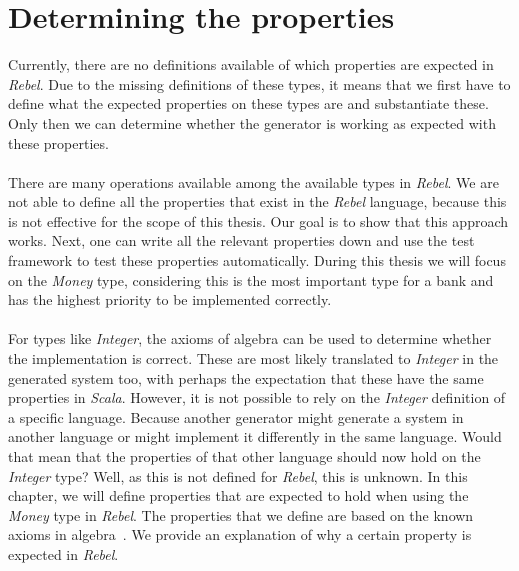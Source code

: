 \section{Determining the properties}
Currently, there are no definitions available of which properties are expected
in \textit{Rebel}. Due to the missing definitions of these types, it means that
we first have to define what the expected properties
on these types are and substantiate these. Only then we can determine whether
the generator is working as expected with these properties.\\
\\
There are many operations available among the available types in \textit{Rebel}.
We are not able to define all the properties that exist in the \textit{Rebel}
language, because this is not effective for the scope of this thesis. Our goal
is to show that this approach works. Next, one can write all the relevant properties
down and use the test framework to test these properties automatically. During
this thesis we will focus on the \textit{Money} type, considering this is the
most important type for a bank and has the highest priority to be implemented
correctly.\\
\\
For types like \textit{Integer}, the axioms of algebra can be used to determine whether
the implementation is correct. These are most likely translated to \textit{Integer} in
the generated system too, with perhaps the expectation that these have the same
properties in \textit{Scala}. However, it is not possible to rely on the
\textit{Integer} definition of a specific language. Because another generator
might generate a system in another language or might implement it differently in
the same language. Would that mean that the properties of that other language
should now hold on the \textit{Integer} type? Well, as this is not defined for
\textit{Rebel}, this is unknown. In this chapter, we will define properties that
are expected to hold when using the \textit{Money} type in \textit{Rebel}. The
properties that we define are based on the known axioms in
algebra~\cite{baumgart1961axioms,raftery2011perspective,apostol2007calculus}. We
provide an explanation of why a certain property is expected in
\textit{Rebel}.\\
\\
